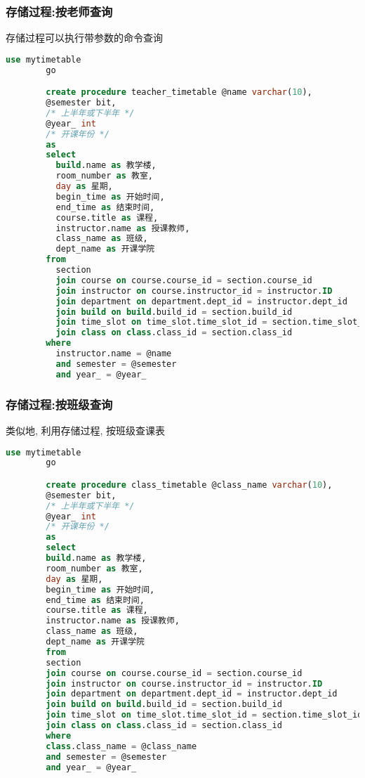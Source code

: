 \documentclass{myreport}
\begin{document}
    \subsubsection{存储过程:按老师查询}
      存储过程可以执行带参数的命令查询
      \begin{lstlisting}[language=sql]
        use mytimetable
        go

        create procedure teacher_timetable @name varchar(10),
        @semester bit,
        /* 上半年或下半年 */
        @year_ int
        /* 开课年份 */
        as
        select
          build.name as 教学楼,
          room_number as 教室,
          day as 星期,
          begin_time as 开始时间,
          end_time as 结束时间,
          course.title as 课程,
          instructor.name as 授课教师,
          class_name as 班级,
          dept_name as 开课学院
        from
          section
          join course on course.course_id = section.course_id
          join instructor on course.instructor_id = instructor.ID
          join department on department.dept_id = instructor.dept_id
          join build on build.build_id = section.build_id
          join time_slot on time_slot.time_slot_id = section.time_slot_id
          join class on class.class_id = section.class_id
        where
          instructor.name = @name
          and semester = @semester
          and year_ = @year_

      \end{lstlisting}

    \subsubsection{存储过程:按班级查询}
      类似地, 利用存储过程, 按班级查课表
      \begin{lstlisting}[language=sql]
        use mytimetable
        go

        create procedure class_timetable @class_name varchar(10),
        @semester bit,
        /* 上半年或下半年 */
        @year_ int
        /* 开课年份 */
        as
        select
        build.name as 教学楼,
        room_number as 教室,
        day as 星期,
        begin_time as 开始时间,
        end_time as 结束时间,
        course.title as 课程,
        instructor.name as 授课教师,
        class_name as 班级,
        dept_name as 开课学院
        from
        section
        join course on course.course_id = section.course_id
        join instructor on course.instructor_id = instructor.ID
        join department on department.dept_id = instructor.dept_id
        join build on build.build_id = section.build_id
        join time_slot on time_slot.time_slot_id = section.time_slot_id
        join class on class.class_id = section.class_id
        where
        class.class_name = @class_name
        and semester = @semester
        and year_ = @year_
      \end{lstlisting}
\end{document}

